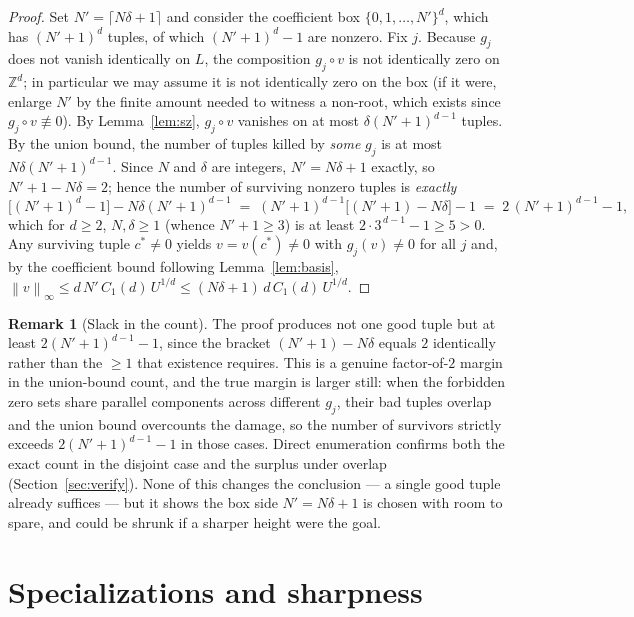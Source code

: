 \documentclass[11pt]{article}
\theoremstyle{definition}
\newtheorem{remark}{Remark}
\newcommand{\Z}{\mathbb{Z}}
\newcommand{\norm}[1]{\left\lVert #1 \right\rVert}
\begin{document}
\begin{proof}
Set $N' = \lceil N\delta + 1\rceil$ and consider the coefficient box
$\{0,1,\dots,N'\}^d$, which has $(N'+1)^d$ tuples, of which $(N'+1)^d - 1$ are nonzero.
Fix $j$. Because $g_j$ does not vanish identically on $L$, the composition
$g_j \circ v$ is not identically zero on $\Z^d$; in particular we may assume it is not
identically zero on the box (if it were, enlarge $N'$ by the finite amount needed to
witness a non-root, which exists since $g_j \circ v \not\equiv 0$). By
Lemma~\ref{lem:sz}, $g_j \circ v$ vanishes on at most $\delta (N'+1)^{d-1}$ tuples.
By the union bound, the number of tuples killed by \emph{some} $g_j$ is at most
$N \delta (N'+1)^{d-1}$. Since $N$ and $\delta$ are integers, $N' = N\delta + 1$
exactly, so $N' + 1 - N\delta = 2$; hence the number of surviving nonzero tuples is
\emph{exactly}
\[
  \big[(N'+1)^d - 1\big] - N\delta (N'+1)^{d-1}
  \;=\; (N'+1)^{d-1}\big[(N'+1) - N\delta\big] - 1
  \;=\; 2\,(N'+1)^{d-1} - 1,
\]
which for $d \ge 2$, $N,\delta \ge 1$ (whence $N'+1 \ge 3$) is at least
$2\cdot 3^{\,d-1} - 1 \ge 5 > 0$. Any surviving tuple $c^\ast \ne 0$ yields
$v = v(c^\ast) \ne 0$ with $g_j(v) \ne 0$ for all $j$ and, by the coefficient bound
following Lemma~\ref{lem:basis},
$\norm{v}_\infty \le d\,N'\,C_1(d)\,U^{1/d} \le (N\delta+1)\,d\,C_1(d)\,U^{1/d}$.
\end{proof}

\begin{remark}[Slack in the count]\label{rem:slack}
The proof produces not one good tuple but at least $2(N'+1)^{d-1} - 1$, since the
bracket $(N'+1) - N\delta$ equals $2$ identically rather than the $\ge 1$ that
existence requires. This is a genuine factor-of-$2$ margin in the union-bound count,
and the true margin is larger still: when the forbidden zero sets share parallel
components across different $g_j$, their bad tuples overlap and the union bound
overcounts the damage, so the number of survivors strictly exceeds
$2(N'+1)^{d-1} - 1$ in those cases. Direct enumeration confirms both the exact count
in the disjoint case and the surplus under overlap (Section~\ref{sec:verify}). None
of this changes the conclusion --- a single good tuple already suffices --- but it
shows the box side $N' = N\delta + 1$ is chosen with room to spare, and could be
shrunk if a sharper height were the goal.
\end{remark}

\section{Specializations and sharpness}
\end{document}
